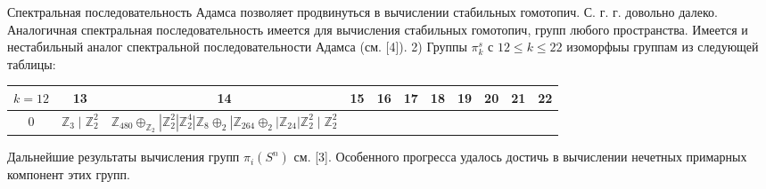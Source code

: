 \documentclass[10pt]{article}
\begin{document}
Спектральная последовательность Адамса позволяет продвинуться в вычислении стабильных гомотопич. С. г. г. довольно далеко. Аналогичная спектральная последовательность имеется для вычисления стабильных гомотопич, групп любого пространства. Имеется и нестабильный аналог спектральной последовательности Адамса (см. [4]). 2) Группы $\pi_{k}^{s}$ с $12 \leqslant k \leqslant 22$ изоморфыы группам из следующей таблицы:



\begin{center}

\begin{tabular}{c|c|c|c|c|c|c|c|c|c|c}

\hline

$k=12$ & 13 & 14 & 15 & 16 & 17 & 18 & 19 & 20 & 21 & 22 \\

\hline

0 & $\mathbb{Z}_{3} \mid \mathbb{Z}_{2}^{2}$ & $\mathbb{Z}_{480} \oplus_{\mathbb{Z}_{2}}\left|\mathbb{Z}_{2}^{2}\right| \mathbb{Z}_{2}^{4}\left|\mathbb{Z}_{8} \oplus_{2}\right| \mathbb{Z}_{264} \oplus_{2}\left|\mathbb{Z}_{24}\right| \mathbb{Z}_{2}^{2} \mid \mathbb{Z}_{2}^{2}$ &  &  &  &  &  &  &  &  \\

\hline

\end{tabular}

\end{center}



Дальнейшие результаты вычисления групп $\pi_{i}\left(S^{n}\right)$ см. [3]. Особенного прогресса удалось достичь в вычислении нечетных примарных компонент этих групп.
\end{document}
